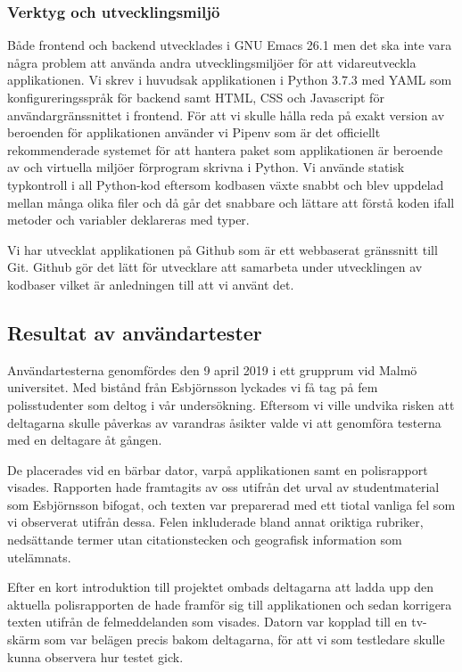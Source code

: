 \documentclass[swedish]{maucsthesis}
\begin{document}
\subsubsection{Verktyg och utvecklingsmiljö}

Både frontend och backend utvecklades i GNU Emacs 26.1 men det ska inte vara några
problem att använda andra utvecklingsmiljöer för att vidareutveckla
applikationen. Vi skrev i huvudsak applikationen i Python 3.7.3 med YAML som
konfigureringsspråk för backend samt HTML, CSS och Javascript för
användargränssnittet i frontend. För att vi skulle hålla reda på exakt version
av beroenden för applikationen använder vi Pipenv som är det officiellt
rekommenderade systemet för att hantera paket som applikationen är beroende av
och virtuella miljöer förprogram skrivna i Python. Vi använde statisk typkontroll
i all Python-kod eftersom kodbasen växte snabbt och blev uppdelad
mellan många olika filer och då går det snabbare och lättare att förstå
koden ifall metoder och variabler deklareras med typer.

Vi har utvecklat applikationen på Github som är ett webbaserat gränssnitt till
Git. Github gör det lätt för utvecklare att samarbeta under utvecklingen av kodbaser
vilket är anledningen till att vi använt det.


\subsection{Resultat av användartester}

Användartesterna genomfördes den 9 april 2019 i ett grupprum vid Malmö
universitet. Med bistånd från Esbjörnsson lyckades vi få tag
på fem polisstudenter som deltog i vår undersökning. Eftersom vi ville undvika risken att
deltagarna skulle påverkas av varandras åsikter valde vi att genomföra testerna
med en deltagare åt gången.

De placerades vid en bärbar dator, varpå applikationen samt en polisrapport
visades. Rapporten hade framtagits av oss utifrån det urval av studentmaterial
som Esbjörnsson bifogat, och texten var preparerad med ett tiotal vanliga
fel som vi observerat utifrån dessa. Felen inkluderade bland annat oriktiga
rubriker, nedsättande termer utan citationstecken och geografisk information som
utelämnats.

Efter en kort introduktion till projektet ombads deltagarna att ladda upp den
aktuella polisrapporten de hade framför sig till applikationen och sedan
korrigera texten utifrån de felmeddelanden som visades. Datorn var kopplad till
en tv-skärm som var belägen precis bakom deltagarna, för att vi som
testledare skulle kunna observera hur testet gick.
\end{document}
